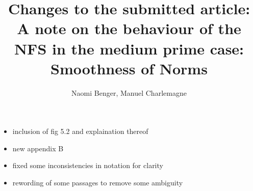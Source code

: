 \documentclass[a4paper, 12pt, envcountsect, runningheads]{article}
\numberwithin{figure}{section}
\numberwithin{equation}{section}
\begin{document}
\title{Changes to the submitted article: \\{\small{A note on the behaviour of the NFS in the medium prime case: Smoothness of Norms}}}
\author{Naomi Benger, %
Manuel Charlemagne}%
\maketitle

\begin{itemize}
\item inclusion of fig 5.2 and explaination thereof 
\item new appendix B
\item fixed some inconsistencies in notation for clarity
\item rewording of some passages to remove some ambiguity
\end{itemize}
\end{document}
